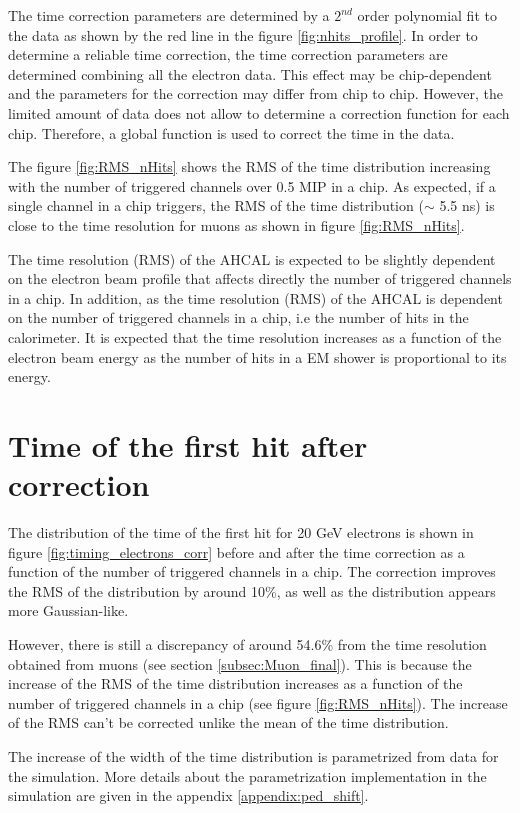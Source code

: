 The time correction parameters are determined by a $2^{nd}$ order polynomial fit to the data as shown by the red line in the figure \ref{fig:nhits_profile}. In order to determine a reliable time correction, the time correction parameters are determined combining all the electron data. This effect may be chip-dependent and the parameters for the correction may differ from chip to chip. However, the limited amount of data does not allow to determine a correction function for each chip. Therefore, a global function is used to correct the time in the data.

The figure \ref{fig:RMS_nHits} shows the RMS of the time distribution increasing with the number of triggered channels over 0.5 MIP in a chip. As expected, if a single channel in a chip triggers, the RMS of the time distribution ($\sim$ 5.5 ns) is close to the time resolution for muons as shown in figure \ref{fig:RMS_nHits}.

The time resolution (RMS) of the AHCAL is expected to be slightly dependent on the electron beam profile that affects directly the number of triggered channels in a chip. In addition, as the time resolution (RMS) of the AHCAL is dependent on the number of triggered channels in a chip, i.e the number of hits in the calorimeter. It is expected that the time resolution increases as a function of the electron beam energy as the number of hits in a EM shower is proportional to its energy.

\section{Time of the first hit after correction}
\label{subsec:Electron_Final}

The distribution of the time of the first hit for 20 GeV electrons is shown in figure \ref{fig:timing_electrons_corr} before and after the time correction as a function of the number of triggered channels in a chip. The correction improves the RMS of the distribution by around 10\%, as well as the distribution appears more Gaussian-like.

However, there is still a discrepancy of around 54.6\% from the time resolution obtained from muons (see section \ref{subsec:Muon_final}). This is because the increase of the RMS of the time distribution increases as a function of the number of triggered channels in a chip (see figure \ref{fig:RMS_nHits}). The increase of the RMS can't be corrected unlike the mean of the time distribution.

The increase of the width of the time distribution is parametrized from data for the simulation. More details about the parametrization implementation in the simulation are given in the appendix \ref{appendix:ped_shift}.

